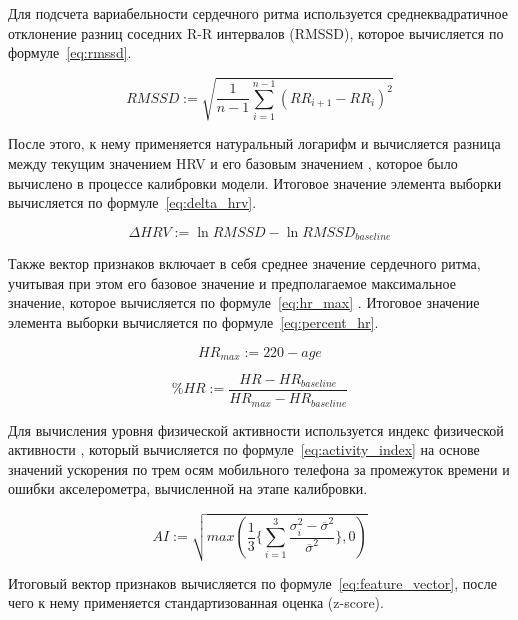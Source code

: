 \documentclass[14pt]{matmex-diploma-custom}
\begin{document}
Для подсчета вариабельности сердечного ритма используется среднеквадратичное
отклонение разниц соседних R-R интервалов (RMSSD), которое вычисляется по
формуле~\ref{eq:rmssd}.

\begin{equation} \label{eq:rmssd}
  RMSSD := \sqrt{\frac{1}{n-1}\sum_{i=1}^{n-1}(RR_{i+1} - RR_{i})^2}
\end{equation}

После этого, к нему применяется натуральный логарифм \cite{article:ln_rmssd} и
вычисляется разница между текущим значением HRV и его базовым значением
\cite{article:delta_reliability}, которое было вычислено в процессе калибровки
модели. Итоговое значение элемента выборки вычисляется по
формуле~\ref{eq:delta_hrv}.

\begin{equation} \label{eq:delta_hrv}
  {\Delta}HRV := \ln{RMSSD} - \ln{RMSSD_{baseline}}
\end{equation}

Также вектор признаков включает в себя среднее значение сердечного ритма,
учитывая при этом его базовое значение и предполагаемое максимальное значение,
которое вычисляется по формуле~\ref{eq:hr_max} \cite{article:age_adjusted_hr}.
Итоговое значение элемента выборки вычисляется по формуле~\ref{eq:percent_hr}.

\begin{equation} \label{eq:hr_max}
  HR_{max} := 220 - age
\end{equation}

\begin{equation} \label{eq:percent_hr}
  \%HR := \frac{HR - HR_{baseline}}{HR_{max} - HR_{baseline}}
\end{equation}

Для вычисления уровня физической активности используется индекс физической
активности \cite{article:activity_index}, который вычисляется по
формуле~\ref{eq:activity_index} на основе значений ускорения по трем осям
мобильного телефона за промежуток времени и ошибки акселерометра, вычисленной на
этапе калибровки.

\begin{equation} \label{eq:activity_index}
  AI := \sqrt{max(\frac{1}{3}\{\sum_{i=1}^3\frac{\sigma_i^2 - \overline{\sigma}^2}{\overline{\sigma}^2}\}, 0)}
\end{equation}

Итоговый вектор признаков вычисляется по формуле~\ref{eq:feature_vector}, после
чего к нему применяется стандартизованная оценка (z-score).
\end{document}
